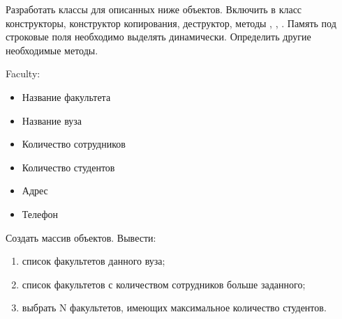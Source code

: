 
Разработать классы для описанных ниже объектов. Включить в класс
конструкторы, конструктор копирования, деструктор, методы ,
, . Память под строковые поля необходимо выделять
динамически. Определить другие необходимые методы.

Faculty:
\begin{itemize}
	\item Название факультета
	\item Название вуза
	\item Количество сотрудников
	\item Количество студентов
	\item Адрес
	\item Телефон
\end{itemize}

Создать массив объектов. Вывести:
\begin{enumerate}
	\item список факультетов данного вуза;
	\item список факультетов с количеством сотрудников больше заданного;
	\item выбрать N факультетов, имеющих максимальное количество студентов.
\end{enumerate}
